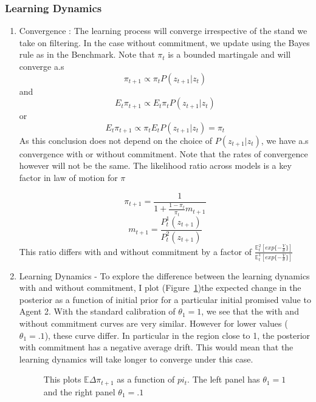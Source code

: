 \documentclass[12pt]{article}
\begin{document}
\subsubsection{Learning Dynamics}
\begin{enumerate}
	\item Convergence : The learning process will converge irrespective of the stand we take on filtering. In the case without commitment, we update using the Bayes rule as in the Benchmark. Note that $\pi_{t}$ is a bounded martingale and will converge a.s
	\[\pi_{t+1}\propto \pi_{t}P(z_{t+1}|z_{t})\]
	and 
	\[E_t\pi_{t+1}\propto E_t\pi_{t}P(z_{t+1}|z_{t})\]
	or 
	\[E_t\pi_{t+1}\propto \pi_{t}E_tP(z_{t+1}|z_{t}) = \pi_t\]
\noindent As this conclusion does not depend on the choice of $P(z_{t+1}|z_{t})$, we have a.s convergence with or without commitment. Note that the rates of convergence however will not be the same. The likelihood ratio across models is a key factor in law of motion for $\pi$

\[\pi_{t+1}=\frac{1}{1+\frac{1-\pi_t}{\pi_t}m_{t+1}}\]
\[m_{t+1}=\frac{P^{1}_t(z_{t+1})}{P^{2}_t(z_{t+1})}	\]
This ratio differs with and without commitment by a factor of $\frac{\mathbb{E}^2_t[exp\{-\frac{V}{\theta}\}]}{\mathbb{E}^1_t[exp\{-\frac{V}{\theta}\}]}$
\item Learning Dynamics - To explore the difference between the learning dynamics with and without commitment, I plot (Figure~\ref{fig:LearningDynamics})the expected change in the posterior as a function of initial prior for a particular initial promised value to Agent 2. With the standard calibration of $\theta_1=1$, we see that the with and without commitment curves are very similar. However for lower values ($\theta_1=.1$), these curve differ. In particular in the region close to 1, the posterior with commitment has a negative average drift. This would mean that the learning dynamics will take longer to converge under this case.
% 
\begin{figure}[htbp]
  \centering
\caption{This plots $\mathbb{E}\Delta \pi_{t+1}$ as a function of $pi_t$. The left panel has $\theta_1=1$ and the right panel $\theta_1=.1$}
  \label{fig:LearningDynamics}
\end{figure}

\end{enumerate}
\end{document}
